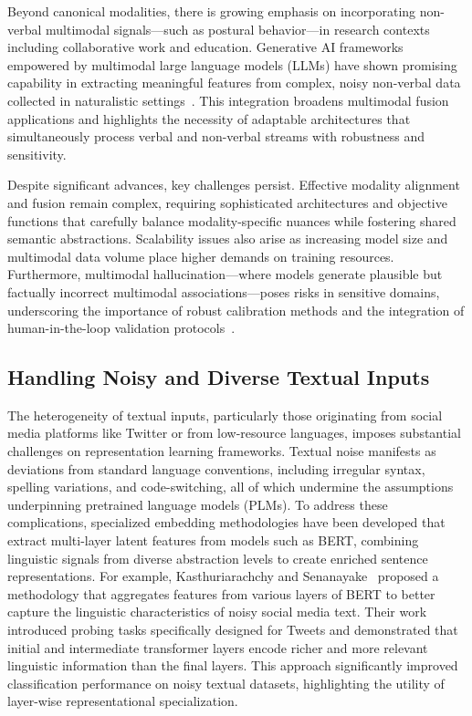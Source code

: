 \documentclass[sigconf]{acmart}
\begin{document}
Beyond canonical modalities, there is growing emphasis on incorporating non-verbal multimodal signals—such as postural behavior—in research contexts including collaborative work and education. Generative AI frameworks empowered by multimodal large language models (LLMs) have shown promising capability in extracting meaningful features from complex, noisy non-verbal data collected in naturalistic settings~\cite{ref1,ref2,ref3}. This integration broadens multimodal fusion applications and highlights the necessity of adaptable architectures that simultaneously process verbal and non-verbal streams with robustness and sensitivity.

Despite significant advances, key challenges persist. Effective modality alignment and fusion remain complex, requiring sophisticated architectures and objective functions that carefully balance modality-specific nuances while fostering shared semantic abstractions. Scalability issues also arise as increasing model size and multimodal data volume place higher demands on training resources. Furthermore, multimodal hallucination—where models generate plausible but factually incorrect multimodal associations—poses risks in sensitive domains, underscoring the importance of robust calibration methods and the integration of human-in-the-loop validation protocols~\cite{ref32,ref6}.

\subsection{Handling Noisy and Diverse Textual Inputs}

The heterogeneity of textual inputs, particularly those originating from social media platforms like Twitter or from low-resource languages, imposes substantial challenges on representation learning frameworks. Textual noise manifests as deviations from standard language conventions, including irregular syntax, spelling variations, and code-switching, all of which undermine the assumptions underpinning pretrained language models (PLMs). To address these complications, specialized embedding methodologies have been developed that extract multi-layer latent features from models such as BERT, combining linguistic signals from diverse abstraction levels to create enriched sentence representations. For example, Kasthuriarachchy and Senanayake~\cite{ref37} proposed a methodology that aggregates features from various layers of BERT to better capture the linguistic characteristics of noisy social media text. Their work introduced probing tasks specifically designed for Tweets and demonstrated that initial and intermediate transformer layers encode richer and more relevant linguistic information than the final layers. This approach significantly improved classification performance on noisy textual datasets, highlighting the utility of layer-wise representational specialization.
\end{document}

